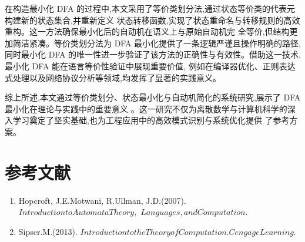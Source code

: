 \documentclass{article}
\begin{document}
   在构造最小化 DFA 的过程中,本文采用了等价类划分法,通过状态等价类的代表元构建新的状态集合,并重新定义
   状态转移函数,实现了状态重命名与转移规则的高效重构。这一方法确保最小化后的自动机在语义上与原始自动机完
   全等价,但结构更加简洁紧凑。等价类划分法为 DFA 最小化提供了一条逻辑严谨且操作明确的路径,同时最小化 DFA
   的唯一性进一步验证了该方法的正确性与有效性。借助这一技术,最小化 DFA 能在语言等价性验证中展现重要价值,
   例如在编译器优化、正则表达式处理以及网络协议分析等领域,均发挥了显著的实践意义。

综上所述,本文通过等价类划分、状态最小化与自动机简化的系统研究,展示了 DFA 最小化在理论与实践中的重要意义
。这一研究不仅为离散数学与计算机科学的深入学习奠定了坚实基础,也为工程应用中的高效模式识别与系统优化提供
了参考方案。


\newpage
\section{参考文献}
\begin{enumerate}
    \item Hopcroft, J.E.Motwani, R.Ullman, J.D.(2007). $Introduction to Automata Theory,$ \newline$Languages, and Computation.$
    \item Sipser.M.(2013). $Introduction to the Theory of Computation. Cengage Learning.$
\end{enumerate}
\end{document}
